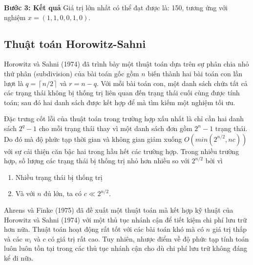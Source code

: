 \begin{example}
\textbf{Bước 3: Kết quả}
Giá trị lớn nhất có thể đạt được là: 150, tương ứng với nghiệm $x = (1, 1, 0, 0, 1, 0)$.
\end{example}

\subsection{Thuật toán Horowitz-Sahni}

Horowitz và Sahni (1974) đã trình bày một thuật toán dựa trên sự phân chia nhỏ thứ phân (subdivision) của bài toán gốc gồm $n$ biến thành hai bài toán con lần lượt là $q = \left \lceil n / 2\right \rceil$ và $r = n - q$. Với mỗi bài toán con, một danh sách chứa tất cả các trạng thái không bị thống trị liên quan đến trạng thái cuối cùng được tính toán; sau đó hai danh sách được kết hợp để mà tìm kiếm một nghiệm tối ưu.

Đặc trưng cốt lỗi của thuật toán trong trường hợp xấu nhất là chỉ cần hai danh sách $2^q - 1$ cho mỗi trạng thái thay vì một danh sách đơn gồm $2^n - 1$ trạng thái. Do đó mà độ phức tạp thời gian và không gian giảm xuống $O(min(2^{n/2}, nc))$ với sự cải thiện căn bậc hai trong hầu hết các trường hợp. Trong nhiều trường hợp, số lượng các trạng thái bị thống trị nhỏ hơn nhiều so với $2^{n/2}$ bởi vì
\begin{enumerate}[label=(\alph*)]
    \item Nhiều trạng thái bị thống trị
    \item Và với $n$ đủ lớn, ta có $c \ll 2^{n/2}$.
\end{enumerate}

Ahrens và Finke (1975) đã đề xuất một thuật toán mà kết hợp kỹ thuật của Horowitz và Sahni (1974) với một thủ tục nhánh cận để tiết kiệm chi phí lưu trữ hơn nữa. Thuật toán hoạt động rất tốt với các bài toán khó mà có $n$ giá trị thấp và các $w_i$ và $c$ có giá trị rất cao. Tuy nhiên, nhược điểm về độ phức tạp tính toán luôn luôn tồn tại trong các thủ tục nhánh cận cho dù chi phí lưu trữ không đáng kể đi nữa. 

